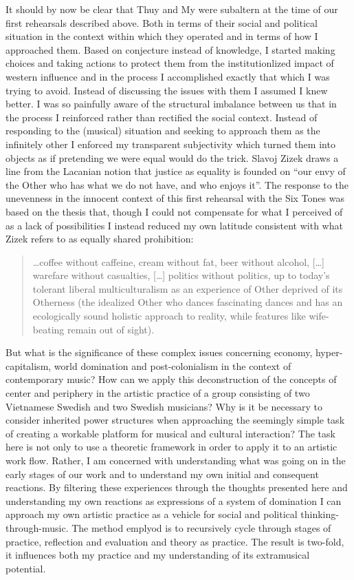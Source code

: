 \documentclass[a4paper]{article}
\begin{document}
It should by now be clear that Thuy and My were subaltern at the time of our first rehearsals described above. Both in terms of their social and political situation in the context within which they operated and in terms of how I approached them. Based on conjecture instead of knowledge, I started making choices and taking actions to protect them from the institutionlized impact of western influence and in the process I accomplished exactly that which I was trying to avoid. Instead of discussing the issues with them I assumed I knew better. I was so painfully aware of the structural imbalance between us that in the process I reinforced rather than rectified the social context. Instead of responding to the (musical) situation and seeking to approach them as the infinitely other I enforced my transparent subjectivity which turned them into objects as if pretending we were equal would do the trick. Slavoj Zizek draws a line from the Lacanian notion that justice as equality is founded on ``our envy of the Other who has what we do not have, and who enjoys it''. The response to the unevenness in the innocent context of this first rehearsal with the Six Tones was based on the thesis that, though I could not compensate for what I perceived of as a lack of possibilities I instead reduced my own latitude consistent with what Zizek refers to as equally shared prohibition:

\begin{quote}
  \ldots coffee without caffeine, cream without fat, beer without alcohol, [\ldots] warefare without casualties, [\ldots] politics without politics, up to today's tolerant liberal multiculturalism as an experience of Other deprived of its Otherness (the idealized Other who dances fascinating dances and has an ecologically sound holistic approach to reality, while features like wife-beating remain out of sight).
\end{quote}

But what is the significance of these complex issues concerning economy, hyper-capitalism, world domination and post-colonialism in the context of contemporary music? How can we apply this deconstruction of the concepts of center and periphery in the artistic practice of a group consisting of two Vietnamese Swedish and two Swedish musicians? Why is it be necessary to consider inherited power structures when approaching the seemingly simple task of creating a workable platform for musical and cultural interaction? The task here is not only to use a theoretic framework in order to apply it to an artistic work flow. Rather, I am concerned with understanding what was going on in the early stages of our work and to understand my own initial and consequent reactions. By filtering these experiences through the thoughts presented here and understanding my own reactions as expressions of a system of domination I can approach my own artistic practice as a vehicle for social and political thinking-through-music. The method emplyod is to recursively cycle through stages of practice, reflection and evaluation and theory as practice. The result is two-fold, it influences both my practice and my understanding of its extramusical potential.
\end{document}
